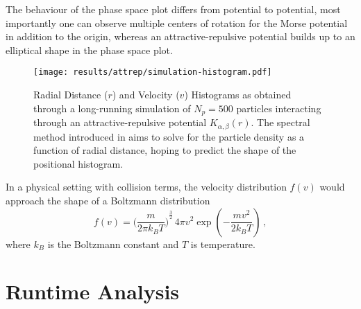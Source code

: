 The behaviour of the phase space plot differs from potential to potential, most importantly one can observe multiple centers of rotation for the Morse potential in addition to the origin, whereas an attractive-repulsive potential builds up to an elliptical shape in the phase space plot.

\begin{figure}[H]
  \centering
  \texttt{[image: results/attrep/simulation-histogram.pdf]}
  \caption[Radial Distance and Velocity Histograms of attractive-repulsive Simulation Output in 1D]{Radial Distance ($r$) and Velocity ($v$) Histograms as obtained through a long-running simulation of $N_p = 500$ particles interacting through an attractive-repulsive potential $K_{\alpha, \beta}(r)$. The spectral method introduced in  aims to solve for the particle density as a function of radial distance, hoping to predict the shape of the positional histogram.}
  \label{fig:simulation-histogram}
\end{figure}

In a physical setting with collision terms, the velocity distribution $f(v)$ would approach the shape of a Boltzmann distribution
$$f(v)={\bigg(\frac{m}{2\pi k_B T}\bigg)}^{\frac {3}{2}}\,4\pi v^{2}\exp \left(-{\frac {mv^{2}}{2k_B T}}\right)\,,$$
where $k_B$ is the Boltzmann constant and $T$ is temperature.

\section{Runtime Analysis}
\hierKoennteIhreWerbungStehen
